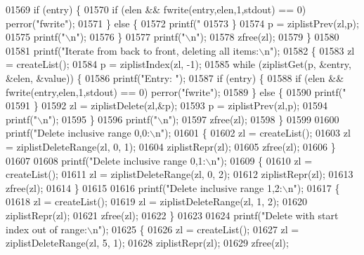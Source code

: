 \begin{DoxyCode}
{{{{{{{{{{{{{{{{{{{{{{{{{01569             \textcolor{keywordflow}{if} (entry) \{
01570                 \textcolor{keywordflow}{if} (elen && fwrite(entry,elen,1,stdout) == 0) perror(\textcolor{stringliteral}{"fwrite"});
01571             \} \textcolor{keywordflow}{else} \{
01572                 printf(\textcolor{stringliteral}{"%
01573             \}
01574             p = ziplistPrev(zl,p);
01575             printf(\textcolor{stringliteral}{"\(\backslash\)n"});
01576         \}
01577         printf(\textcolor{stringliteral}{"\(\backslash\)n"});
01578         zfree(zl);
01579     \}
01580 
01581     printf(\textcolor{stringliteral}{"Iterate from back to front, deleting all items:\(\backslash\)n"});
01582     \{
01583         zl = createList();
01584         p = ziplistIndex(zl, -1);
01585         \textcolor{keywordflow}{while} (ziplistGet(p, &entry, &elen, &value)) \{
01586             printf(\textcolor{stringliteral}{"Entry: "});
01587             \textcolor{keywordflow}{if} (entry) \{
01588                 \textcolor{keywordflow}{if} (elen && fwrite(entry,elen,1,stdout) == 0) perror(\textcolor{stringliteral}{"fwrite"});
01589             \} \textcolor{keywordflow}{else} \{
01590                 printf(\textcolor{stringliteral}{"%
01591             \}
01592             zl = ziplistDelete(zl,&p);
01593             p = ziplistPrev(zl,p);
01594             printf(\textcolor{stringliteral}{"\(\backslash\)n"});
01595         \}
01596         printf(\textcolor{stringliteral}{"\(\backslash\)n"});
01597         zfree(zl);
01598     \}
01599 
01600     printf(\textcolor{stringliteral}{"Delete inclusive range 0,0:\(\backslash\)n"});
01601     \{
01602         zl = createList();
01603         zl = ziplistDeleteRange(zl, 0, 1);
01604         ziplistRepr(zl);
01605         zfree(zl);
01606     \}
01607 
01608     printf(\textcolor{stringliteral}{"Delete inclusive range 0,1:\(\backslash\)n"});
01609     \{
01610         zl = createList();
01611         zl = ziplistDeleteRange(zl, 0, 2);
01612         ziplistRepr(zl);
01613         zfree(zl);
01614     \}
01615 
01616     printf(\textcolor{stringliteral}{"Delete inclusive range 1,2:\(\backslash\)n"});
01617     \{
01618         zl = createList();
01619         zl = ziplistDeleteRange(zl, 1, 2);
01620         ziplistRepr(zl);
01621         zfree(zl);
01622     \}
01623 
01624     printf(\textcolor{stringliteral}{"Delete with start index out of range:\(\backslash\)n"});
01625     \{
01626         zl = createList();
01627         zl = ziplistDeleteRange(zl, 5, 1);
01628         ziplistRepr(zl);
01629         zfree(zl);
}}}}}}}}}}}}}}}}}}}}}}}}}}}
\end{DoxyCode}
